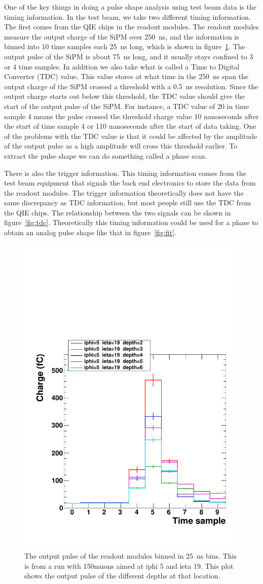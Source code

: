 One of the key things in doing a pulse shape analysis using test beam data is the timing information. In the test beam, we take two different timing information. The first comes from the QIE chips in the readout modules. The readout modules measure the output charge of the SiPM over 250~ns, and the information is binned into 10 time samples each 25~ns long, which is shown in figure~\ref{fig:PulSh}. The output pulse of the SiPM is about 75~ns long, and it usually stays confined to 3 or 4 time samples. In addition we also take what is called a Time to Digital Converter (TDC) value. This value stores at what time in the 250~ns span the output charge of the SiPM crossed a threshold with a 0.5~ns resolution. Since the output charge starts out below this threshold, the TDC value should give the start of the output pulse of the SiPM. For instance, a TDC value of 20 in time sample 4 means the pulse crossed the threshold charge value 10 nanoseconds after the start of time sample 4 or 110 nanoseconds after the start of data taking. One of the problems with the TDC value is that it could be affected by the amplitude of the output pulse as a high amplitude will cross this threshold earlier. To extract the pulse shape we can do something called a phase scan. 

There is also the trigger information. This timing information comes from the test beam equipment that signals the back end electronics to store the data from the readout modules. The trigger information theoretically does not have the same discrepancy as TDC information, but most people still use the TDC from the QIE chips. The relationship between the two signals can be shown in figure~\ref{fig:tdc}. Theoretically this timing information could be used for a phase to obtain an analog pulse shape like that in figure~\ref{fig:fit}.

\begin{figure}
\centering
\includegraphics[width=0.6\linewidth]{Figures/Pulse.pdf}
\caption{The output pulse of the readout modules binned in 25~ns bins. This is from a run with 150\GeV\space muons aimed at iphi 5 and ieta 19. This plot shows the output pulse of the different depths at that location.}
\label{fig:PulSh}
\end{figure}

